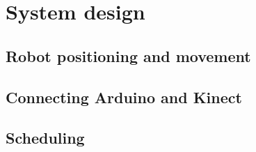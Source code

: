 \chapter{System design}
\label{chap:System design}


\section{Robot positioning and movement}
\label{sec:Robot positioning and movement}

\section{Connecting Arduino and Kinect}
\label{sec:Connecting Arduino and Kinect}

\section{Scheduling}
\label{sec:Scheduling}
